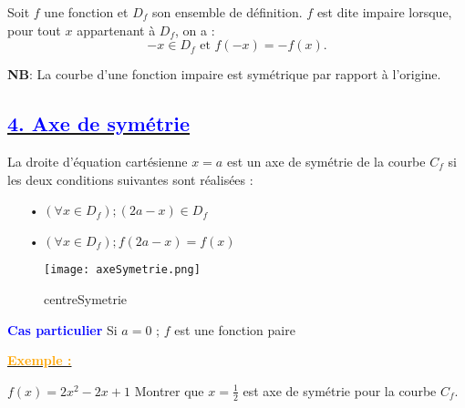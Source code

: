 \documentclass{article}
\newcounter{exemple}
\newcommand{\exemple}{%
  \refstepcounter{exemple}%
  \textbf{\textcolor{orange}{Exemple \theexemple : }} \ignorespaces
}
\begin{document}
Soit $f$ une fonction et $D_f$ son ensemble de définition. $f$ est dite impaire lorsque, pour tout $x$ appartenant à $D_f$, on a :
\[
-x \in D_f \text{ et } f(-x) = -f(x).
\]

\textbf{NB}: La courbe d'une fonction impaire est symétrique par rapport à l’origine.

\begin{center}
\end{center}

\subsection*{\underline{\textbf{\textcolor{blue}{4. Axe de symétrie}}}}
La droite d'équation cartésienne \( x=a \) est un axe de symétrie de la courbe \( C_{f} \) si les deux conditions suivantes sont réalisées :

\begin{itemize}
\item[•] \( (\forall x \in D_{f}) ; ( 2a-x ) \in D_{f} \)
\item[•] \( (\forall x \in D_{f}) ; f( 2a-x )=f(x) \)
\end{itemize}

\begin{figure}[H]%
\centering
\texttt{[image: axeSymetrie.png]}
\caption{centreSymetrie}
\label{fig:monimage}
\end{figure}

\textbf{\textcolor{blue}{Cas particulier}} Si \( a=0 \) ; \( f \) est une fonction paire

\textbf{\underline{\exemple}}

\( f(x)=2x^{2}-2x+1 \) Montrer que \( x=\frac{1}{2} \) est axe de symétrie pour la courbe \( C_{f} \).
\end{document}
